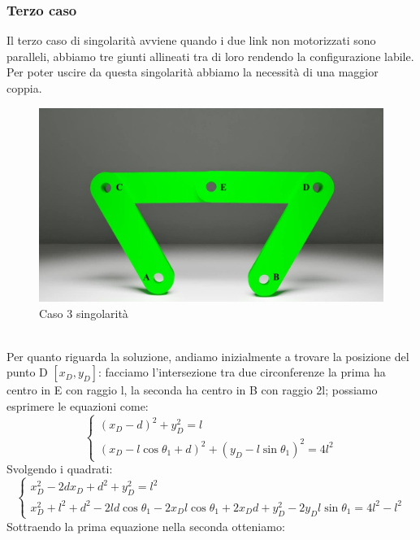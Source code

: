 \subsubsection*{Terzo caso}
Il terzo caso di singolarità avviene quando i due link non motorizzati sono paralleli, abbiamo tre giunti allineati tra di loro rendendo la configurazione labile. Per poter uscire da questa singolarità abbiamo la necessità di una maggior coppia.
\begin{figure}[ht]
	\begin{center}
		\includegraphics[scale=0.3]{Immagini/Singolarity/5}
		\caption{Caso 3 singolarità}
	\end{center}
\end{figure}
\\Per quanto riguarda la soluzione, andiamo inizialmente a trovare la posizione del punto D $[x_D,y_D]$: facciamo l'intersezione tra due circonferenze la prima ha centro in E con raggio l, la seconda ha centro in B con raggio 2l; possiamo esprimere le equazioni come:
\begin{equation}
	\begin{cases}
		(x_D-d)^2 +y_D^2= l \\
		(x_D-l\cos\theta_1+d)^2 + (y_D-l\sin\theta_1)^2 = 4l^2
	\end{cases}
\end{equation}
Svolgendo i quadrati:
\begin{equation*}
	\begin{cases}
	 x_D^2-2dx_D+d^2+y_D^2 = l^2 \\
	 x_D^2+ l^2 + d^2-2ld\cos\theta_1 -2x_Dl\cos\theta_1+2x_Dd + y_D^2-2y_Dl\sin\theta_1 = 4l^2-l^2
	\end{cases}
\end{equation*}
Sottraendo la prima equazione nella seconda otteniamo: 
